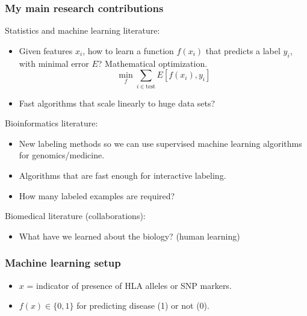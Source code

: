 \documentclass{beamer}
\begin{document}
\begin{frame}
  \frametitle{My main research contributions}
  Statistics and machine learning literature:
  \begin{itemize}
  \item Given features $x_i$, how to learn a function $f(x_i)$ that predicts a
    label $y_i$, with minimal error $E$? Mathematical optimization.
    $$
\min_f
\sum_{i\in\text{test}}
E[f(x_i), y_i]
$$
  \item Fast algorithms that scale linearly to huge data sets?
  \end{itemize}
  Bioinformatics literature:
  \begin{itemize}
  \item New labeling methods so we can use supervised machine learning
    algorithms for genomics/medicine.
  \item Algorithms that are fast enough for interactive labeling.
  \item How many labeled examples are required?
  \end{itemize}
  Biomedical literature (collaborations):
  \begin{itemize}
  \item What have we learned about the biology? (human learning)
  \end{itemize}
\end{frame}


\begin{frame}
  \frametitle{Machine learning setup}
  \begin{itemize}
  \item $x$ = indicator of presence of HLA alleles or SNP markers.
  \item $f(x)\in\{0,1\}$ for predicting disease (1) or not (0).
  \end{itemize}
\end{frame}
\end{document}

